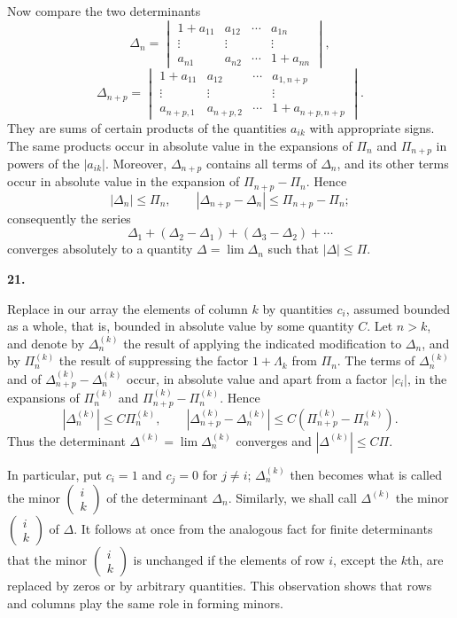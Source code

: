 \documentclass[
  paper=b5,
  fontsize=13pt,
  twoside=true,
  open=any,
  bookmarkpackage=false,
  chapterprefix=true,
  headings=normal
]{scrbook}
\theoremstyle{definition}
\newcommand{\numberedparagraph}[1]{%
  \par\medskip\phantomsection\label{sec:#1}%
  \noindent\textbf{#1.}\enspace
}
\begin{document}
Now compare the two determinants
\[
 \Delta_n=
 \begin{vmatrix}
   1+a_{11}&a_{12}&\cdots&a_{1n}\\
   \vdots&\vdots&&\vdots\\
   a_{n1}&a_{n2}&\cdots&1+a_{nn}
 \end{vmatrix},
\]
\[
 \Delta_{n+p}=
 \begin{vmatrix}
   1+a_{11}&a_{12}&\cdots&a_{1,n+p}\\
   \vdots&\vdots&&\vdots\\
   a_{n+p,1}&a_{n+p,2}&\cdots&1+a_{n+p,n+p}
 \end{vmatrix}.
\]
They are sums of certain products of the quantities $a_{ik}$ with appropriate signs. The same products occur in absolute value in the expansions of $\Pi_n$ and $\Pi_{n+p}$ in powers of the $|a_{ik}|$. Moreover, $\Delta_{n+p}$ contains all terms of $\Delta_n$, and its other terms occur in absolute value in the expansion of $\Pi_{n+p}-\Pi_n$. Hence
\[
  |\Delta_n|\leq\Pi_n,
  \qquad
  |\Delta_{n+p}-\Delta_n|\leq\Pi_{n+p}-\Pi_n;
\]
consequently the series
\[
  \Delta_1+(\Delta_2-\Delta_1)+(\Delta_3-\Delta_2)+\cdots
\]
converges absolutely to a quantity $\Delta=\lim\Delta_n$ such that $|\Delta|\leq\Pi$.

\numberedparagraph{21}
Replace in our array the elements of column $k$ by quantities $c_i$, assumed bounded as a whole, that is, bounded in absolute value by some quantity $C$. Let $n>k$, and denote by $\Delta_n^{(k)}$ the result of applying the indicated modification to $\Delta_n$, and by $\Pi_n^{(k)}$ the result of suppressing the factor $1+\Lambda_k$ from $\Pi_n$. The terms of $\Delta_n^{(k)}$ and of $\Delta_{n+p}^{(k)}-\Delta_n^{(k)}$ occur, in absolute value and apart from a factor $|c_i|$, in the expansions of $\Pi_n^{(k)}$ and $\Pi_{n+p}^{(k)}-\Pi_n^{(k)}$. Hence
\[
 |\Delta_n^{(k)}|\leq C\Pi_n^{(k)},\qquad
 |\Delta_{n+p}^{(k)}-\Delta_n^{(k)}|
 \leq C(\Pi_{n+p}^{(k)}-\Pi_n^{(k)}).
\]
Thus the determinant $\Delta^{(k)}=\lim\Delta_n^{(k)}$ converges and $|\Delta^{(k)}|\leq C\Pi$.

In particular, put $c_i=1$ and $c_j=0$ for $j\ne i$; $\Delta_n^{(k)}$ then becomes what is called the minor
$\left(\begin{smallmatrix}i\\k\end{smallmatrix}\right)$ of the determinant $\Delta_n$. Similarly, we shall call $\Delta^{(k)}$ the minor $\left(\begin{smallmatrix}i\\k\end{smallmatrix}\right)$ of $\Delta$. It follows at once from the analogous fact for finite determinants that the minor $\left(\begin{smallmatrix}i\\k\end{smallmatrix}\right)$ is unchanged if the elements of row $i$, except the $k$th, are replaced by zeros or by arbitrary quantities. This observation shows that rows and columns play the same role in forming minors.
\end{document}
